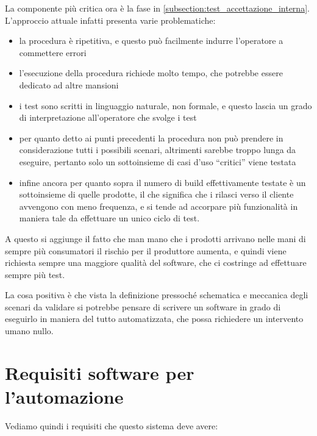 \documentclass[12pt,a4paper,twoside,titlepage]{book}
\begin{document}
La componente più critica ora è la fase in \autoref{subsection:test_accettazione_interna}. 
L'approccio attuale infatti presenta varie problematiche:
\begin{itemize}
    \item la procedura è ripetitiva, e questo può facilmente indurre
        l'operatore a commettere errori
    \item l'esecuzione della procedura richiede molto tempo, che potrebbe essere dedicato
        ad altre mansioni
    \item i test sono scritti in linguaggio naturale, non formale, e questo lascia un grado di 
        interpretazione all'operatore che svolge i test
    \item per quanto detto ai punti precedenti la procedura non può prendere in considerazione 
        tutti i possibili scenari, altrimenti sarebbe troppo lunga da eseguire, pertanto solo un 
        sottoinsieme di casi d'uso ``critici'' viene testata
    \item infine ancora per quanto sopra il numero di build effettivamente testate
        è un sottoinsieme di quelle prodotte, il che significa che
        i rilasci verso il cliente avvengono con meno frequenza, e si tende ad accorpare
        più funzionalità in maniera tale da effettuare un unico ciclo di test.
\end{itemize}

A questo si aggiunge il fatto che man mano che i prodotti arrivano nelle mani di sempre più consumatori 
il rischio per il produttore aumenta, e quindi viene richiesta sempre una maggiore qualità del software, 
che ci costringe ad effettuare sempre più test. 

La cosa positiva è che vista la definizione pressoché schematica e meccanica degli scenari da validare 
si potrebbe pensare di scrivere un software in grado di eseguirlo in maniera del tutto automatizzata, 
che possa richiedere un intervento umano nullo.

\section{Requisiti software per l'automazione}

Vediamo quindi i requisiti che questo sistema deve avere:
\end{document}
